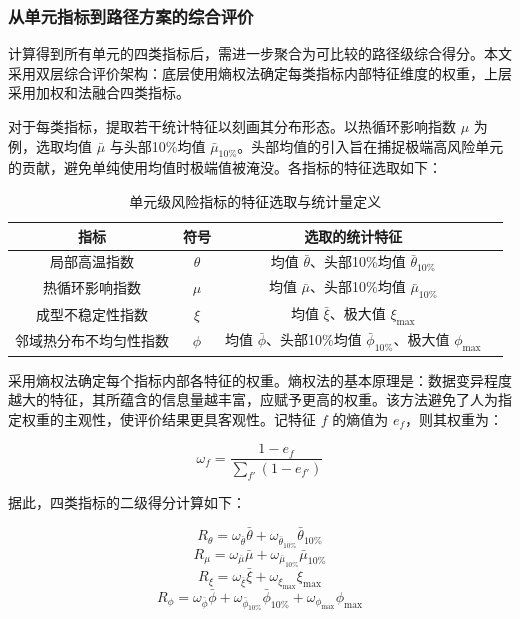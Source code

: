 \documentclass[a4paper, 12pt]{ctexart}
\begin{document}
\subsubsection{从单元指标到路径方案的综合评价}

计算得到所有单元的四类指标后，需进一步聚合为可比较的路径级综合得分。本文采用双层综合评价架构：底层使用熵权法确定每类指标内部特征维度的权重，上层采用加权和法融合四类指标。

对于每类指标，提取若干统计特征以刻画其分布形态。以热循环影响指数 $\mu$ 为例，选取均值 $\bar{\mu}$ 与头部10\%均值 $\bar{\mu}_{10\%}$。头部均值的引入旨在捕捉极端高风险单元的贡献，避免单纯使用均值时极端值被淹没。各指标的特征选取如下：

\begin{table}[H]
    \centering
    \caption{单元级风险指标的特征选取与统计量定义}
    \label{tab:risk_features}
    \begin{tabular}{cccc}
        \toprule
        指标 & 符号 & 选取的统计特征 \\
        \midrule
        局部高温指数 & $\theta$ & 均值 $\bar{\theta}$、头部10\%均值 $\bar{\theta}_{10\%}$  \\
        热循环影响指数 & $\mu$ & 均值 $\bar{\mu}$、头部10\%均值 $\bar{\mu}_{10\%}$  \\
        成型不稳定性指数 & $\xi$ & 均值 $\bar{\xi}$、极大值 $\xi_{\max}$  \\
        邻域热分布不均匀性指数 & $\phi$ & 均值 $\bar{\phi}$、头部10\%均值 $\bar{\phi}_{10\%}$、极大值 $\phi_{\max}$  \\
        \bottomrule
    \end{tabular}
\end{table}

采用熵权法确定每个指标内部各特征的权重。熵权法的基本原理是：数据变异程度越大的特征，其所蕴含的信息量越丰富，应赋予更高的权重。该方法避免了人为指定权重的主观性，使评价结果更具客观性。记特征 $f$ 的熵值为 $e_f$，则其权重为：

\begin{equation}
    \omega_f = \frac{1 - e_f}{\sum_{f'} (1 - e_{f'})}
\end{equation}

据此，四类指标的二级得分计算如下：

\begin{equation}
    R_{\theta} = \omega_{\bar{\theta}} \bar{\theta} + \omega_{\bar{\theta}_{10\%}} \bar{\theta}_{10\%}
\end{equation}
\begin{equation}
    R_{\mu} = \omega_{\bar{\mu}} \bar{\mu} + \omega_{\bar{\mu}_{10\%}} \bar{\mu}_{10\%}
\end{equation}
\begin{equation}
    R_{\xi} = \omega_{\bar{\xi}} \bar{\xi} + \omega_{\xi_{\max}} \xi_{\max}
\end{equation}
\begin{equation}
    R_{\phi} = \omega_{\bar{\phi}} \bar{\phi} + \omega_{\bar{\phi}_{10\%}} \bar{\phi}_{10\%} + \omega_{\phi_{\max}} \phi_{\max}
\end{equation}
\end{document}
